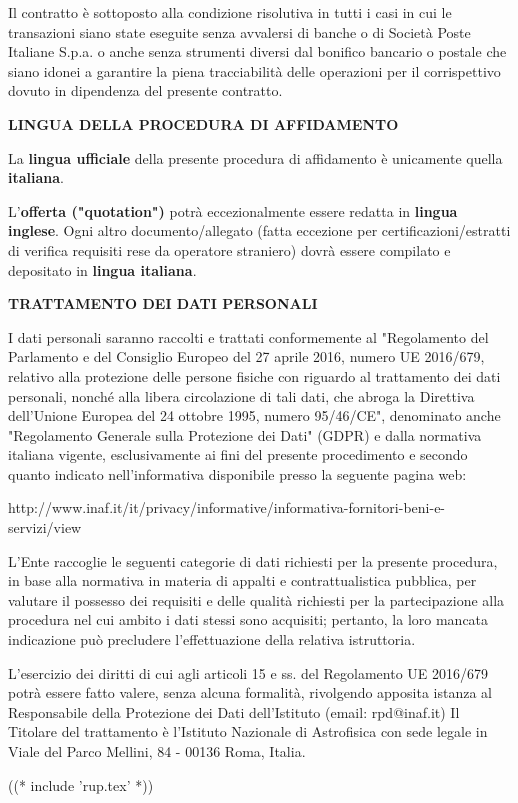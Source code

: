 Il contratto è sottoposto alla condizione risolutiva in tutti i casi
in cui le transazioni siano state eseguite senza avvalersi di banche
o di Società Poste Italiane S.p.a. o anche senza strumenti diversi
dal bonifico bancario o postale che siano idonei a garantire la piena
tracciabilità delle operazioni per il corrispettivo dovuto in dipendenza
del presente contratto.

\textbf{LINGUA DELLA PROCEDURA DI AFFIDAMENTO}

La \textbf{lingua ufficiale} della presente procedura di affidamento è unicamente quella \textbf{italiana}. 

L'\textbf{offerta ("quotation")} potrà eccezionalmente essere
redatta in \textbf{lingua inglese}. Ogni altro documento/allegato
(fatta eccezione per certificazioni/estratti di verifica requisiti
rese da operatore straniero) dovrà essere compilato e depositato in
\textbf{lingua italiana}.

\textbf{TRATTAMENTO DEI DATI PERSONALI}

I dati personali saranno raccolti e trattati conformemente al "Regolamento
del Parlamento e del Consiglio Europeo del 27 aprile 2016, numero UE
2016/679,  relativo alla protezione delle persone fisiche con riguardo
al trattamento dei dati personali, nonché alla libera circolazione
di tali dati, che abroga la Direttiva dell'Unione Europea del 24
ottobre 1995, numero 95/46/CE", denominato anche "Regolamento Generale
sulla Protezione dei Dati" (GDPR) e dalla normativa italiana vigente,
esclusivamente ai fini del presente procedimento e secondo quanto indicato
nell'informativa disponibile presso la seguente pagina web:

http://www.inaf.it/it/privacy/informative/informativa-fornitori-beni-e-servizi/view

L'Ente raccoglie le seguenti categorie di dati richiesti per la
presente procedura, in base alla normativa in materia di appalti
e contrattualistica pubblica, per valutare il possesso dei requisiti
e delle qualità richiesti per la partecipazione alla procedura nel cui
ambito i dati stessi sono acquisiti; pertanto, la loro mancata indicazione
può precludere l'effettuazione della relativa istruttoria.

L'esercizio dei diritti di cui agli articoli 15 e ss. del Regolamento UE
2016/679 potrà essere fatto valere, senza alcuna formalità, rivolgendo
apposita istanza al Responsabile della Protezione dei Dati dell'Istituto
(email: rpd@inaf.it) Il Titolare del trattamento è l'Istituto Nazionale
di Astrofisica con sede legale in Viale del Parco Mellini, 84 - 00136
Roma, Italia.

((* include 'rup.tex' *))


